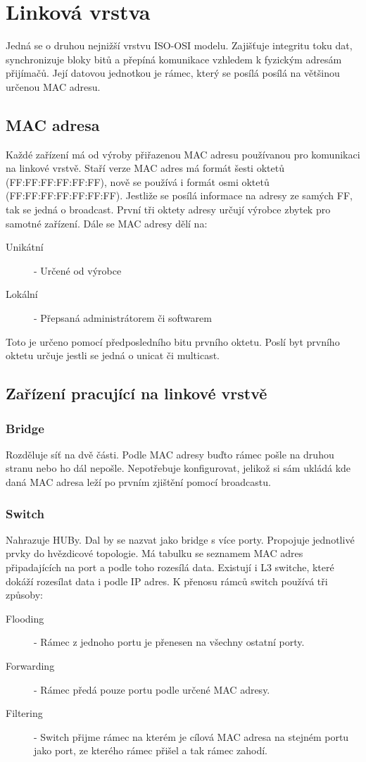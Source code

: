 \section{Linková vrstva}
\label{sec:linkova-vrstva}
Jedná se o druhou nejnižší vrstvu ISO-OSI modelu.
Zajišťuje integritu toku dat, synchronizuje bloky bitů a přepíná komunikace vzhledem k fyzickým adresám přijímačů.
Její datovou jednotkou je rámec, který se posílá posílá na většinou určenou MAC adresu.
\subsection{MAC adresa}
Každé zařízení má od výroby přiřazenou MAC adresu používanou pro komunikaci na linkové vrstvě.
Staří verze MAC adres má formát šesti oktetů (FF:FF:FF:FF:FF:FF), nově se používá i formát osmi oktetů (FF:FF:FF:FF:FF:FF:FF).
Jestliže se posílá informace na adresy ze samých FF, tak se jedná o broadcast.
První tři oktety adresy určují výrobce zbytek pro samotné zařízení.
Dále se MAC adresy dělí na:
\begin{description}
  \item[Unikátní]- Určené od výrobce
  \item[Lokální]- Přepsaná administrátorem či softwarem
\end{description}
Toto je určeno pomocí předposledního bitu prvního oktetu.
Poslí byt prvního oktetu určuje jestli se jedná o unicat či multicast.
\subsection{Zařízení pracující na linkové vrstvě}
\subsubsection{Bridge}
Rozděluje síť na dvě části.
Podle MAC adresy buďto rámec pošle na druhou stranu nebo ho dál nepošle.
Nepotřebuje konfigurovat, jelikož si sám ukládá kde daná MAC adresa leží po prvním zjištění pomocí broadcastu.
\subsubsection{Switch}
Nahrazuje HUBy.
Dal by se nazvat jako bridge s více porty.
Propojuje jednotlivé prvky do hvězdicové topologie.
Má tabulku se seznamem MAC adres připadajících na port a podle toho rozesílá data.
Existují i L3 switche, které dokáží rozesílat data i podle IP adres.
K přenosu rámců switch používá tři způsoby:
\begin{description}
  \item[Flooding]- Rámec z jednoho portu je přenesen na všechny ostatní porty.
  \item[Forwarding]- Rámec předá pouze portu podle určené MAC adresy.
  \item[Filtering]- Switch přijme rámec na kterém je cílová MAC adresa na stejném portu jako port, ze kterého rámec přišel a tak rámec zahodí.   
\end{description}
